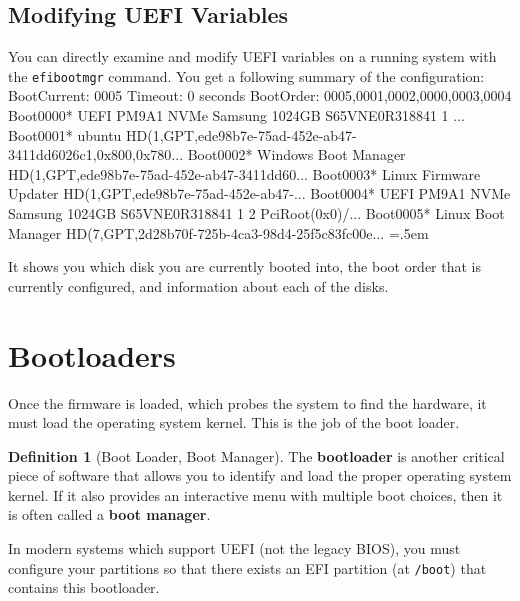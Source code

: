 \documentclass{article}
\theoremstyle{definition}
\newtheorem{definition}{Definition}[section]
\newenvironment{cverbatim}
    {\SaveVerbatim{cverb}}
    {\endSaveVerbatim
    \flushleft\fboxrule=0pt\fboxsep=.5em
    \colorbox{cverbbg}{%
      \makebox[\dimexpr\linewidth-2\fboxsep][l]{\BUseVerbatim{cverb}}%
    }
    \endflushleft
  }
\begin{document}
  \subsection{Modifying UEFI Variables}

    You can directly examine and modify UEFI variables on a running system with the \texttt{efibootmgr} command. You get a following summary of the configuration: 
    \begin{cverbatim}
      BootCurrent: 0005
      Timeout: 0 seconds
      BootOrder: 0005,0001,0002,0000,0003,0004
      Boot0000* UEFI PM9A1 NVMe Samsung 1024GB S65VNE0R318841 1	...
      Boot0001* ubuntu	HD(1,GPT,ede98b7e-75ad-452e-ab47-3411dd6026c1,0x800,0x780...
      Boot0002* Windows Boot Manager	HD(1,GPT,ede98b7e-75ad-452e-ab47-3411dd60...
      Boot0003* Linux Firmware Updater	HD(1,GPT,ede98b7e-75ad-452e-ab47-...
      Boot0004* UEFI PM9A1 NVMe Samsung 1024GB S65VNE0R318841 1 2	PciRoot(0x0)/...
      Boot0005* Linux Boot Manager	HD(7,GPT,2d28b70f-725b-4ca3-98d4-25f5c83fc00e...
    \end{cverbatim}

  It shows you which disk you are currently booted into, the boot order that is currently configured, and information about each of the disks. 

\section{Bootloaders} 

  Once the firmware is loaded, which probes the system to find the hardware, it must load the operating system kernel. This is the job of the boot loader.

  \begin{definition}[Boot Loader, Boot Manager]
    The \textbf{bootloader} is another critical piece of software that allows you to identify and load the proper operating system kernel. If it also provides an interactive menu with multiple boot choices, then it is often called a \textbf{boot manager}. 
  \end{definition}

  In modern systems which support UEFI (not the legacy BIOS), you must configure your partitions so that there exists an EFI partition (at \texttt{/boot}) that contains this bootloader. 
\end{document}
